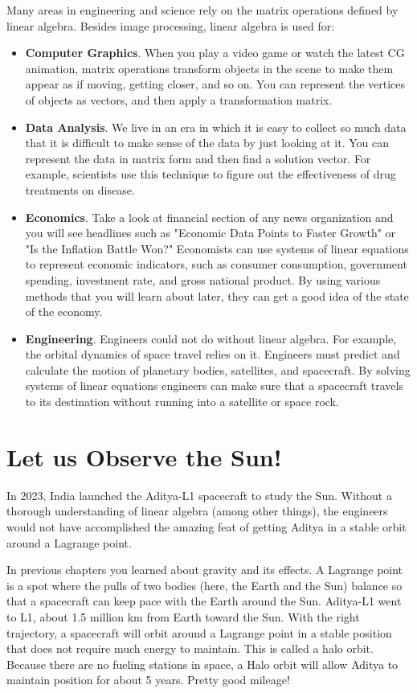 Many areas in engineering and science rely on the matrix operations defined by 
linear algebra. Besides image processing, linear algebra is used for: 
\begin{itemize}
\item \textbf{Computer Graphics}. When you play a video game or watch the latest CG 
animation, matrix operations transform objects in the scene to make them appear 
as if moving, getting closer, and so on. You can represent the vertices of 
objects as vectors, and then apply a transformation matrix.
\item \textbf{Data Analysis}. We live in an era in which it is easy to collect so much 
data that it is difficult to make sense of the data by just looking at it. You 
can represent the data in matrix form and then find a solution vector. For 
example, scientists use this technique to figure out the effectiveness of drug 
treatments on disease.
\item \textbf{Economics}. Take a look at financial section of any news organization and 
you will see headlines such as "Economic Data Points to Faster Growth" or "Is 
the Inflation Battle Won?" Economists can use systems of linear equations to 
represent economic indicators, such as consumer consumption, government 
spending, investment rate, and gross national product. By using various methods 
that you will learn about later, they can get a good idea of the state of the 
economy.
\item \textbf{Engineering}. Engineers could not do without linear algebra. For example, 
the orbital dynamics of space travel relies on it. Engineers must predict and 
calculate the motion of planetary bodies, satellites, and spacecraft. By 
solving systems of linear equations engineers can make sure that a spacecraft 
travels to its destination without running into a satellite or space rock.
\end{itemize}

\section{Let us Observe the Sun!}
In 2023, India launched the Aditya-L1 spacecraft to study the Sun. 
Without a thorough understanding of linear algebra (among other things), the 
engineers would not have accomplished the amazing feat of getting Aditya in a 
stable orbit around a Lagrange point. 

In previous chapters you learned about gravity and its effects. A Lagrange point is a spot where the pulls of two bodies
(here, the Earth and the Sun) balance so that a spacecraft can keep pace
with the Earth around the Sun. Aditya-L1 went to L1, about 1.5 million km
from Earth toward the Sun. With the right trajectory, a 
spacecraft will orbit around a Lagrange point in a stable position that 
does not require much energy to maintain. This is called a halo orbit. Because 
there are no fueling stations in space, a Halo orbit will allow Aditya to 
maintain position for about 5 years. Pretty good mileage!

